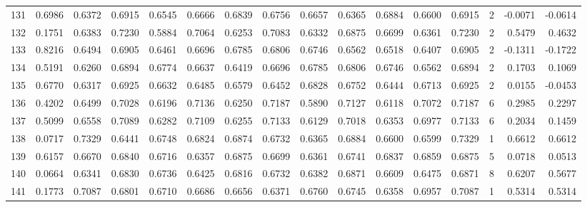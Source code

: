 \begin{tabular}{lrrrrrrrrrrrrrrr}
131 &      0.6986 &  0.6372 &  0.6915 &  0.6545 &  0.6666 &  0.6839 &  0.6756 &  0.6657 &  0.6365 &  0.6884 &   0.6600 &     0.6915 &      2 &                   -0.0071 &                    -0.0614 \\
132 &      0.1751 &  0.6383 &  0.7230 &  0.5884 &  0.7064 &  0.6253 &  0.7083 &  0.6332 &  0.6875 &  0.6699 &   0.6361 &     0.7230 &      2 &                    0.5479 &                     0.4632 \\
133 &      0.8216 &  0.6494 &  0.6905 &  0.6461 &  0.6696 &  0.6785 &  0.6806 &  0.6746 &  0.6562 &  0.6518 &   0.6407 &     0.6905 &      2 &                   -0.1311 &                    -0.1722 \\
134 &      0.5191 &  0.6260 &  0.6894 &  0.6774 &  0.6637 &  0.6419 &  0.6696 &  0.6785 &  0.6806 &  0.6746 &   0.6562 &     0.6894 &      2 &                    0.1703 &                     0.1069 \\
135 &      0.6770 &  0.6317 &  0.6925 &  0.6632 &  0.6485 &  0.6579 &  0.6452 &  0.6828 &  0.6752 &  0.6444 &   0.6713 &     0.6925 &      2 &                    0.0155 &                    -0.0453 \\
136 &      0.4202 &  0.6499 &  0.7028 &  0.6196 &  0.7136 &  0.6250 &  0.7187 &  0.5890 &  0.7127 &  0.6118 &   0.7072 &     0.7187 &      6 &                    0.2985 &                     0.2297 \\
137 &      0.5099 &  0.6558 &  0.7089 &  0.6282 &  0.7109 &  0.6255 &  0.7133 &  0.6129 &  0.7018 &  0.6353 &   0.6977 &     0.7133 &      6 &                    0.2034 &                     0.1459 \\
138 &      0.0717 &  0.7329 &  0.6441 &  0.6748 &  0.6824 &  0.6874 &  0.6732 &  0.6365 &  0.6884 &  0.6600 &   0.6599 &     0.7329 &      1 &                    0.6612 &                     0.6612 \\
139 &      0.6157 &  0.6670 &  0.6840 &  0.6716 &  0.6357 &  0.6875 &  0.6699 &  0.6361 &  0.6741 &  0.6837 &   0.6859 &     0.6875 &      5 &                    0.0718 &                     0.0513 \\
140 &      0.0664 &  0.6341 &  0.6830 &  0.6736 &  0.6425 &  0.6816 &  0.6732 &  0.6382 &  0.6871 &  0.6609 &   0.6475 &     0.6871 &      8 &                    0.6207 &                     0.5677 \\
141 &      0.1773 &  0.7087 &  0.6801 &  0.6710 &  0.6686 &  0.6656 &  0.6371 &  0.6760 &  0.6745 &  0.6358 &   0.6957 &     0.7087 &      1 &                    0.5314 &                     0.5314 \\

\end{tabular}
